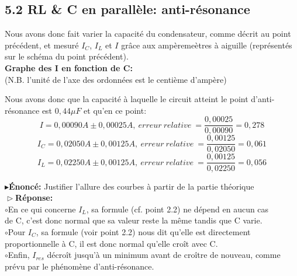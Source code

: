 \documentclass{report}
\begin{document}
\subsection*{5.2 RL \& C en parall\`ele: anti-r\'esonance}

Nous avons donc fait varier la capacit\'e du condensateur, comme d\'ecrit au point pr\'ec\'edent, et mesur\'e $I_{C}$, $I_{L}$ et $I$ gr\^ace aux amp\`ereme\`etres \`a aiguille (repr\'esent\'es sur le sch\'ema du point pr\'ec\'edent). \\

\textbf{Graphe des I en fonction de C:} \\ 
(N.B. l'unit\'e de l'axe des ordonn\'ees est le centi\`eme d'amp\`ere) 
\begin{figure}[h]
\centering
\end{figure}

\hspace*{0.5cm}Nous avons donc que la capacit\'e \`a laquelle le circuit atteint le point d'anti-r\'esonance est $0,44\mu F$ et qu'en ce point: 
$$I = 0,00090A \pm 0,00025A,\ erreur\ relative\ = \frac{0,00025}{0,00090} = 0,278$$
$$I_C = 0,02050A \pm 0,00125A,\ erreur\ relative\ = \frac{0,00125}{0,02050} = 0,061$$
$$I_L = 0,02250A \pm 0,00125A,\ erreur\ relative\ = \frac{0,00125}{0,02250} = 0,056$$

\pagebreak

\textbf{$\blacktriangleright$\'Enonc\'e:} Justifier l'allure des courbes \`a partir de la partie th\'eorique \\

\textbf{$\vartriangleright$R\'eponse:}  \\ 

$\circ$En ce qui concerne $I_{L}$, sa formule (cf. point 2.2) ne d\'epend en aucun cas\\ \hspace*{0.75cm}de C, c'est donc normal que sa valeur reste la m\^eme tandis que C varie.\\

$\circ$Pour $I_{C}$, sa formule (voir point 2.2) nous dit qu'elle est directement\\ \hspace*{0.75cm}proportionnelle \`a C, il est donc normal qu'elle cro\^it avec C. \\

$\circ$Enfin, $I_{res}$ d\'ecro\^it jusqu'\`a un minimum avant de cro\^itre de nouveau, comme\\
\hspace*{0.75cm}pr\'evu par le ph\'enom\`ene d'anti-r\'esonance. \\
\end{document}
